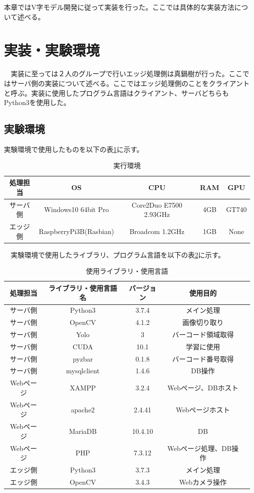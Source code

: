 本章ではV字モデル開発に従って実装を行った。ここでは具体的な実装方法について述べる。
\section{実装・実験環境}
　実装に至っては２人のグループで行いエッジ処理側は真鍋樹が行った。ここではサーバ側の実装について述べる。ここではエッジ処理側のことをクライアントと呼ぶ。実装に使用したプログラム言語はクライアント、サーバどちらもPython3を使用した。


\subsection*{実験環境}
実験環境で使用したものを以下の表\ref{spec}に示す。
\begin{table}[htb]
\begin{center}
\caption{実行環境}
\begin{tabular}{|c|c|c|c|c|} \hline
処理担当 & OS & CPU & RAM & GPU \\ \hline
サーバ側 & Windows10 64bit Pro & Core2Duo E7500 2.93GHz & 4GB & GT740 \\ \hline
エッジ側 & RaspberryPi3B(Rasbian) & Broadcom 1.2GHz & 1GB & None \\ \hline
\end{tabular}
\label{spec}
	\end{center}
\end{table}


　実験環境で使用したライブラリ、プログラム言語を以下の表\ref{library_spec}に示す。
\begin{table}[htb]
\begin{center}
\caption{使用ライブラリ・使用言語}
\begin{tabular}{|c|c|c|c|c|} \hline
処理担当 & ライブラリ・使用言語名 & バージョン & 使用目的 \\ \hline \hline
サーバ側 & Python3 & 3.7.4 & メイン処理	\\ \hline
サーバ側 & OpenCV & 4.1.2 & 画像切り取り\\ \hline
サーバ側 & Yolo & 3 & バーコード領域取得\\ \hline
サーバ側 & CUDA & 10.1 & 学習に使用\\ \hline
サーバ側 & pyzbar & 0.1.8 & バーコード番号取得\\ \hline
サーバ側 & mysqlclient & 1.4.6 & DB操作\\ \hline \hline
Webページ & XAMPP & 3.2.4 & Webページ、DBホスト\\ \hline
Webページ & apache2 & 2.4.41 & Webページホスト\\ \hline
Webページ & MariaDB & 10.4.10 & DB\\ \hline
Webページ & PHP & 7.3.12 & Webページ処理、DB操作\\ \hline \hline
エッジ側 & Python3 & 3.7.3 & メイン処理		\\ \hline
エッジ側 & OpenCV & 3.4.3 & Webカメラ操作\\ \hline
\end{tabular}
\label{library_spec}
	\end{center}
\end{table}


